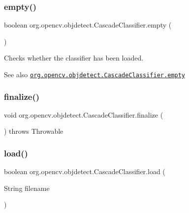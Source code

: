 \subsubsection{\texorpdfstring{empty()}{empty()}}
{\footnotesize\ttfamily boolean org.\+opencv.\+objdetect.\+Cascade\+Classifier.\+empty (\begin{DoxyParamCaption}{ }\end{DoxyParamCaption})}

Checks whether the classifier has been loaded.

\begin{DoxySeeAlso}{See also}
\href{http://docs.opencv.org/modules/objdetect/doc/cascade_classification.html#cascadeclassifier-empty}{\tt org.\+opencv.\+objdetect.\+Cascade\+Classifier.\+empty} 
\end{DoxySeeAlso}
\mbox{\label{classorg_1_1opencv_1_1objdetect_1_1_cascade_classifier_a3982599d115781cebe9c6489281c2bd4}} 
\subsubsection{\texorpdfstring{finalize()}{finalize()}}
{\footnotesize\ttfamily void org.\+opencv.\+objdetect.\+Cascade\+Classifier.\+finalize (\begin{DoxyParamCaption}{ }\end{DoxyParamCaption}) throws Throwable\hspace{0.3cm}{\ttfamily [protected]}}

\mbox{\label{classorg_1_1opencv_1_1objdetect_1_1_cascade_classifier_a5335f53219be85c1192ce1d788504a42}} 
\subsubsection{\texorpdfstring{load()}{load()}}
{\footnotesize\ttfamily boolean org.\+opencv.\+objdetect.\+Cascade\+Classifier.\+load (\begin{DoxyParamCaption}\item[{String}]{filename }\end{DoxyParamCaption})}

